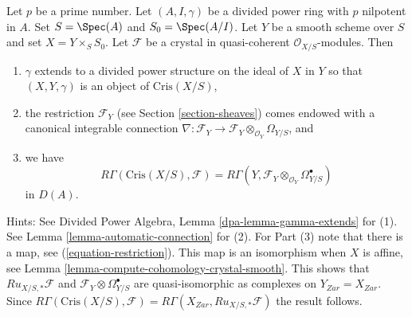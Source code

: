 \begin{remark}[Comparison]
\label{remark-comparison}
Let $p$ be a prime number. Let $(A, I, \gamma)$ be a divided power
ring with $p$ nilpotent in $A$. Set $S = \Spec(A)$ and
$S_0 = \Spec(A/I)$. Let $Y$ be a smooth scheme over $S$ and set
$X = Y \times_S S_0$. Let
$\mathcal{F}$ be a crystal in quasi-coherent $\mathcal{O}_{X/S}$-modules.
Then
\begin{enumerate}
\item $\gamma$ extends to a divided power structure on the ideal
of $X$ in $Y$ so that $(X, Y, \gamma)$ is an object of $\text{Cris}(X/S)$,
\item the restriction $\mathcal{F}_Y$ (see Section \ref{section-sheaves})
comes endowed with a canonical integrable connection
$\nabla : \mathcal{F}_Y \to
\mathcal{F}_Y \otimes_{\mathcal{O}_Y} \Omega_{Y/S}$, and
\item we have
$$
R\Gamma(\text{Cris}(X/S), \mathcal{F}) =
R\Gamma(Y, \mathcal{F}_Y \otimes_{\mathcal{O}_Y} \Omega^\bullet_{Y/S})
$$
in $D(A)$.
\end{enumerate}
Hints: See Divided Power Algebra, Lemma \ref{dpa-lemma-gamma-extends} for (1).
See Lemma \ref{lemma-automatic-connection} for (2).
For Part (3) note that there is a map, see
(\ref{equation-restriction}). This map is an isomorphism when
$X$ is affine, see
Lemma \ref{lemma-compute-cohomology-crystal-smooth}.
This shows that $Ru_{X/S, *}\mathcal{F}$ and
$\mathcal{F}_Y \otimes \Omega^\bullet_{Y/S}$ are quasi-isomorphic
as complexes on $Y_{Zar} = X_{Zar}$.
Since $R\Gamma(\text{Cris}(X/S), \mathcal{F}) =
R\Gamma(X_{Zar}, Ru_{X/S, *}\mathcal{F})$ the result follows.
\end{remark}

